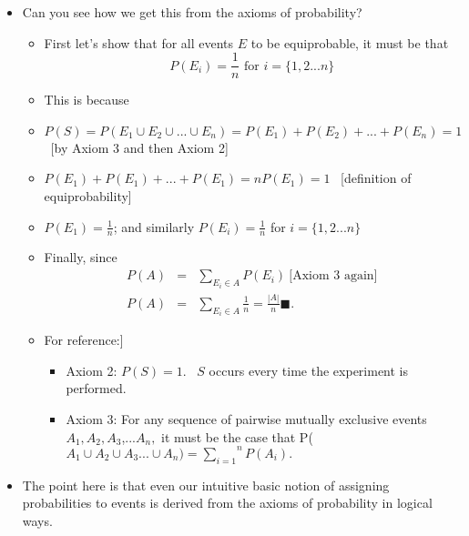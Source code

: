 \documentclass[11pt]{article}
\begin{document}
\begin{itemize}
\begin{itemize}
\item Can you see how we get this from the axioms of probability?

\begin{itemize}
\item First let's show that for all events $E$ to be equiprobable, it must
be that%
\begin{equation*}
P\left( E_{i}\right) =\frac{1}{n}\text{ for }i=\{1,2...n\}
\end{equation*}

\item This is because

\item $P(S)=P\left( E_{1}\cup E_{2}\cup ...\cup E_{n}\right) =P\left(
E_{1}\right) +P\left( E_{2}\right) +...+P\left( E_{n}\right) =1$ \ [by Axiom
3 and then Axiom 2]

\item $P\left( E_{1}\right) +P\left( E_{1}\right) +...+P\left( E_{1}\right)
=nP\left( E_{1}\right) =1$ \ [definition of equiprobability]

\item $P\left( E_{1}\right) =\frac{1}{n}$; and similarly $P\left(
E_{i}\right) =\frac{1}{n}$ for $i=\{1,2...n\}$

\item Finally, since%
\begin{eqnarray*}
P\left( A\right) &=&\sum_{E_{i}\in A}P\left( E_{i}\right) \ \text{[Axiom 3
again]} \\
P\left( A\right) &=&\sum_{E_{i}\in A}\frac{1}{n}=\frac{|A|}{n}\blacksquare .
\end{eqnarray*}

\item \lbrack For reference:]

\begin{itemize}
\item Axiom 2: $P(S)=1.$ \ $S$ occurs every time the experiment is performed.

\item Axiom 3: For any sequence of pairwise mutually exclusive events $%
A_{1},A_{2},A_{3}$,...$A_{n},$ it must be the case that P($A_{1}\cup
A_{2}\cup A_{3}...\cup A_{n})=\overset{n}{\underset{i=1}{\sum }}P(A_{i}).$
\end{itemize}
\end{itemize}

\item The point here is that even our intuitive basic notion of assigning
probabilities to events is derived from the axioms of probability in logical
ways.
\end{itemize}
\end{itemize}
\end{document}
